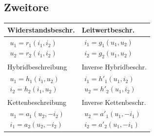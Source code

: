 \documentclass[6pt,a4paper]{scrartcl}
\begin{document}
\begin{multicols}{4}
	\subsection{Zweitore}
	\begin{tabular}{l|l}
	Widerstandsbeschr. & Leitwertbeschr. \\ \midrule
	$\begin{array}{ll} u_1=r_1(i_1,i_2) \\ u_2=r_2(i_1,i_2) \end{array}$ & $\begin{array}{ll} i_1=g_1(u_1,u_2) \\ i_2=g_2(u_1,u_2) \end{array}$  \\ \addlinespace[0.2cm]
	Hybridbeschreibung  & Inverse Hybridbeschr.  \\ \midrule
	$\begin{array}{ll} u_1=h_1(i_1,u_2) \\ i_2=h_2(i_1,u_2) \end{array}$ & $\begin{array}{ll} i_1=h'_1(u_1,i_2) \\ u_2=h'_2(u_1,i_2) \end{array}$   \\ \addlinespace[0.2cm]

	Kettenbeschreibung & Inverse Kettenbeschr. \\ \midrule
	$\begin{array}{ll} u_1=a_1(u_2,-i_2) \\ i_1=a_2(u_2,-i_2) \end{array}$ & $\begin{array}{ll} u_2=a'_1(u_1,-i_1) \\ i_2=a'_2(u_1,-i_1) \end{array}$ \\
	\end{tabular}

		





\end{multicols}
\end{document}
